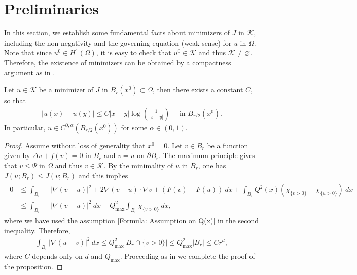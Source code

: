 \documentclass[11pt,reqno]{amsart}
\begin{document}
\section{Preliminaries}\label{Section: perliminaries}
In this section, we establish some fundamental facts about minimizers of $J$ in $\mathcal{K}$, including the non-negativity and the governing equation (weak sense) for $u$ in $\Omega$. Note that since $u^{0}\in H^{1}(\Omega)$, it is easy to check that $u^{0}\in\mathcal{K}$ and thus $\mathcal{K}\neq\varnothing$. Therefore, the existence of minimizers can be obtained by a compactness argument as in \cite[Lemma 3.1]{AC1981}.
\begin{proposition}\label{Proposition: Minimizers are Holder continuous}
	Let $u\in\mathcal{K}$ be a minimizer of $J$ in $B_{r}(x^{0})\subset\Omega$, then there exists a constant $C$, so that
	\begin{align*}
		|u(x)-u(y)|\leqslant C|x-y|\log\left(\frac{1}{|x-y|}\right)\quad\text{ in }B_{r/2}(x^{0}).
	\end{align*} 
	In particular, $u\in C^{0,\alpha}(B_{r/2}(x^{0}))$ for some $\alpha\in(0,1)$.
\end{proposition}
\begin{proof}
	Assume without loss of generality that $x^{0}=0$. Let $v\in B_{r}$ be a function given by $\Delta v+f(v)=0$ in $B_{r}$ and $v=u$ on $\partial B_{r}$. The maximum principle gives that $v\leqslant\Psi$ in $\Omega$ and thus $v\in\mathcal{K}$. By the minimality of $u$ in $B_{r}$, one has $J(u;B_{r})\leqslant J(v;B_{r})$ and this implies
	\begin{align}\label{Formula: P(0)}
		\begin{alignedat}{2}
				0&\leqslant\int_{B_{r}}-|\nabla(v-u)|^{2}+2\nabla(v-u)\cdot\nabla v+(F(v)-F(u))\:dx+\int_{B_{r}}Q^{2}(x)(\chi_{\{v>0\}}-\chi_{\{u>0\}})\:dx\\
			&\leqslant\int_{B_{r}}-|\nabla(v-u)|^{2}\:dx+Q_{\mathrm{max}}^{2}\int_{B_{r}}\chi_{\{v>0\}}\:dx,
		\end{alignedat}
	\end{align}
	where we have used the assumption \eqref{Formula: Assumption on Q(x)} in the second inequality. Therefore,
	\begin{align*}
		\int_{B_{r}}|\nabla(u-v)|^{2}\:dx\leqslant Q_{\mathrm{max}}^{2}|B_{r}\cap\{v>0\}|\leqslant Q_{\mathrm{max}}^{2}|B_{r}|\leqslant Cr^{d},
	\end{align*}
	where $C$ depends only on $d$ and $Q_{\mathrm{max}}$. Proceeding as in \cite[Theorem 2.1]{ACF1984TMS} we complete the proof of the proposition.
\end{proof}
\end{document}
